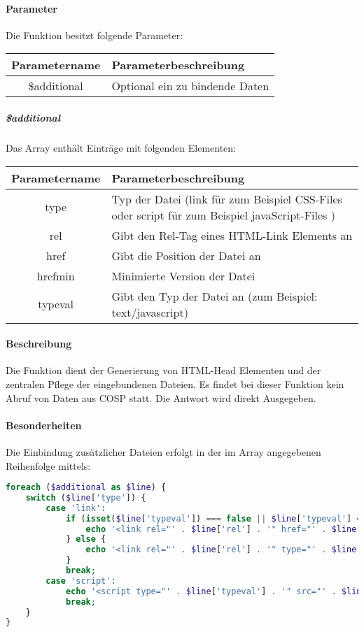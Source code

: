 \paragraph{Parameter} Die Funktion besitzt folgende Parameter:
\begin{table}[H]
	\begin{tabular}{|c|p{11cm}|}
		\hline
		\textbf{Parametername} & \textbf{Parameterbeschreibung} \\ \hline
		\$additional & Optional ein zu bindende Daten \\ \hline
	\end{tabular}
\end{table}
\subparagraph{\$additional}Das Array enthält Einträge mit folgenden Elementen:
\begin{table}[H]
	\begin{tabular}{|c|p{11cm}|}
		\hline
		\textbf{Parametername} & \textbf{Parameterbeschreibung} \\ \hline
		type    & Typ der Datei ({\glqq link\grqq} für zum Beispiel CSS-Files oder {\glqq script\grqq} für zum Beispiel javaScript-Files ) \\ \hline
		rel     & Gibt den Rel-Tag eines HTML-Link Elements an \\ \hline
		href    & Gibt die Position der Datei an \\ \hline
		hrefmin & Minimierte Version der Datei \\ \hline
		typeval & Gibt den Typ der Datei an (zum Beispiel: {\glqq text/javascript\grqq}) \\ \hline
	\end{tabular}
\end{table}
\paragraph{Beschreibung} Die Funktion dient der Generierung von HTML-Head Elementen und der zentralen Pflege der eingebundenen Dateien. Es findet bei dieser Funktion kein Abruf von Daten aus {\glqq COSP\grqq} statt. Die Antwort wird direkt Ausgegeben.
\paragraph{Besonderheiten} Die Einbindung zusätzlicher Dateien erfolgt in der im Array angegebenen Reihenfolge mittels:
\begin{lstlisting}[language=php]
foreach ($additional as $line) {
	switch ($line['type']) {
		case 'link':
			if (isset($line['typeval']) === false || $line['typeval'] === "") {
				echo '<link rel="' . $line['rel'] . '" href="' . $line['href'] . '" >';
			} else {
				echo '<link rel="' . $line['rel'] . '" type="' . $line['typeval'] . '" href="' . $line['href'] . '" >';
			}
			break;
		case 'script':
			echo '<script type="' . $line['typeval'] . '" src="' . $line['href'] . '" ></script>';
			break;
	}
}
\end{lstlisting}
